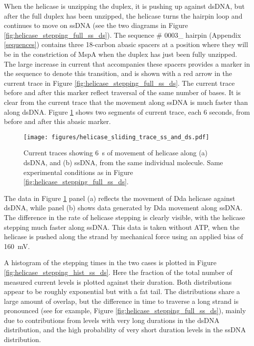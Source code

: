 When the helicase is unzipping the duplex, it is pushing up against dsDNA, but after the full duplex has been unzipped, the helicase turns the hairpin loop and continues to move on ssDNA (see the two diagrams in Figure \ref{fig:helicase_stepping_full_ss_ds}).  The sequence \# 0003\_ hairpin (Appendix \ref{sequences}) contains three 18-carbon abasic spacers at a position where they will be in the constriction of MspA when the duplex has just been fully unzipped.  The large increase in current that accompanies these spacers provides a marker in the sequence to denote this transition, and is shown with a red arrow in the current trace in Figure \ref{fig:helicase_stepping_full_ss_ds}.  The current trace before and after this marker reflect traversal of the same number of bases.  It is clear from the current trace that the movement along ssDNA is much faster than along dsDNA.  Figure \ref{fig:helicase_stepping_ss_ds} shows two segments of current trace, each \num{6} seconds, from before and after this abasic marker.

\begin{figure}[h]
\begin{centering}
\texttt{[image: figures/helicase\_sliding\_trace\_ss\_and\_ds.pdf]}
\caption[Forced helicase stepping on dsDNA versus ssDNA]{Current traces showing \SI{6}{\s} of movement of helicase along (a) dsDNA, and (b) ssDNA, from the same individual molecule.  Same experimental conditions as in Figure \ref{fig:helicase_stepping_full_ss_ds}.}
\label{fig:helicase_stepping_ss_ds}
\end{centering}
\end{figure}

The data in Figure \ref{fig:helicase_stepping_ss_ds} panel (a) reflects the movement of Dda helicase against dsDNA, while panel (b) shows data generated by Dda movement along ssDNA.  The difference in the rate of helicase stepping is clearly visible, with the helicase stepping much faster along ssDNA.  This data is taken without ATP, when the helicase is pushed along the strand by mechanical force using an applied bias of \SI{160}{\mV}.

A histogram of the stepping times in the two cases is plotted in Figure \ref{fig:helicase_stepping_hist_ss_ds}.  Here the fraction of the total number of measured current levels is plotted against their duration.  Both distributions appear to be roughly exponential but with a fat tail.  The distributions share a large amount of overlap, but the difference in time to traverse a long strand is pronounced (see for example, Figure \ref{fig:helicase_stepping_full_ss_ds}), mainly due to contributions from levels with very long durations in the dsDNA distribution, and the high probability of very short duration levels in the ssDNA distribution.

